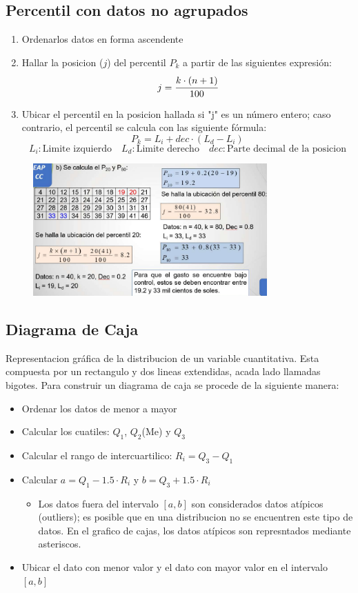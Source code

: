 \documentclass{article}
\begin{document}
    \subsection{Percentil con datos no agrupados}
        \begin{enumerate}
            \item Ordenarlos datos en forma ascendente
            \item Hallar la posicion ($j$) del percentil $P_k$ a partir de las siguientes expresión: \[j=\cfrac{k\cdot(n+1)}{100}\]
            \item Ubicar el percentil en la posicion hallada si "j" es un número entero; caso contrario, el percentil se calcula con las siguiente fórmula: \[P_k = L_i + dec\cdot (L_d-L_i)\]
            \[L_i:\text{Limite izquierdo}\quad L_d:\text{Limite derecho}\quad dec:\text{Parte decimal de la posicion}\] 
        \end{enumerate}
        \begin{figure}[H]
            \centering
            \includegraphics[width=0.8\textwidth]{img/percentil.png}
        \end{figure}
    
    \subsection{Diagrama de Caja}
        Representacion gráfica de la distribucion de un variable cuantitativa. Esta compuesta por un rectangulo  y dos lineas extendidas, acada lado llamadas bigotes.
        Para construir un diagrama de caja se procede de la siguiente manera:
        \begin{itemize}
            \item Ordenar los datos de menor a mayor
            \item Calcular los cuatiles: $Q_1$, $Q_2$(Me) y $Q_3$
            \item Calcular el rango de intercuartilico: $R_i = Q_3 - Q_1$
            \item Calcular $a = Q_1 - 1.5\cdot R_i$ y $b = Q_3 + 1.5\cdot R_i$
                \begin{itemize}
                    \item Los datos fuera del intervalo $[a,b]$ son considerados datos atípicos (outliers); es posible que en una distribucion no se encuentren este tipo de datos. En el grafico de cajas, los datos atípicos son represntados mediante asteriscos.
                \end{itemize}
            \item Ubicar el dato con menor valor y el dato con mayor valor en el intervalo $[a,b]$
        \end{itemize}
\end{document}

